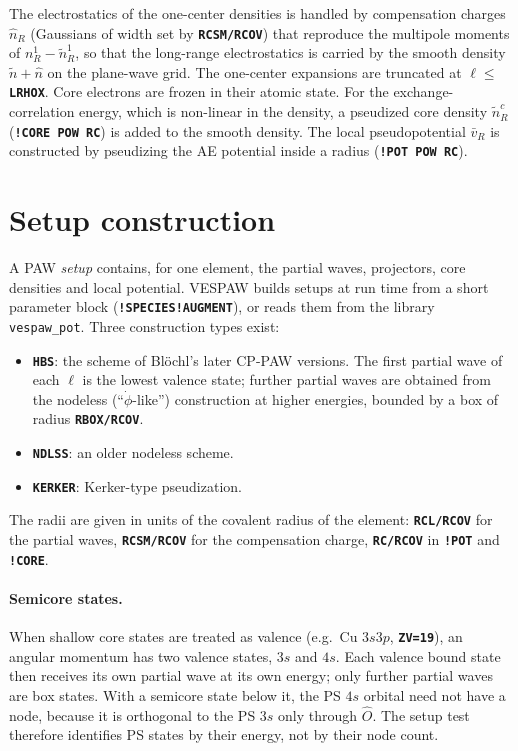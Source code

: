 \documentclass[11pt,a4paper,oneside]{book}
\newcommand{\key}[1]{\textbf{\texttt{#1}}}
\begin{document}
The electrostatics of the one-center densities is handled by
compensation charges $\hat n_R$ (Gaussians of width set by
\key{RCSM/RCOV}) that reproduce the multipole moments of
$n^1_R-\tilde n^1_R$, so that the long-range electrostatics is carried by
the smooth density $\tilde n+\hat n$ on the plane-wave grid. The
one-center expansions are truncated at $\ell\le$ \key{LRHOX}. Core
electrons are frozen in their atomic state. For the exchange-correlation
energy, which is non-linear in the density, a pseudized core density
$\tilde n^c_R$ (\key{!CORE POW RC}) is added to the smooth density. The
local pseudopotential $\bar v_R$ is constructed by pseudizing the AE
potential inside a radius (\key{!POT POW RC}).

\section{Setup construction}\label{sec:setups}

A PAW \emph{setup} contains, for one element, the partial waves,
projectors, core densities and local potential. VESPAW builds setups at
run time from a short parameter block (\key{!SPECIES!AUGMENT}), or reads
them from the library \texttt{vespaw\_pot}. Three construction types exist:
\begin{itemize}
\item \key{HBS}: the scheme of Bl\"ochl's later CP-PAW versions. The
  first partial wave of each $\ell$ is the lowest valence state; further
  partial waves are obtained from the nodeless (``$\dot\phi$-like'')
  construction at higher energies, bounded by a box of radius
  \key{RBOX/RCOV}.
\item \key{NDLSS}: an older nodeless scheme.
\item \key{KERKER}: Kerker-type pseudization.
\end{itemize}
The radii are given in units of the covalent radius of the element:
\key{RCL/RCOV} for the partial waves, \key{RCSM/RCOV} for the compensation
charge, \key{RC/RCOV} in \key{!POT} and \key{!CORE}.

\paragraph{Semicore states.} When shallow core states are treated as
valence (e.g.\ Cu $3s3p$, \key{ZV=19}), an angular momentum has two
valence states, $3s$ and $4s$. Each valence bound state then receives its
own partial wave at its own energy; only further partial waves are box
states. With a semicore state below it, the PS $4s$ orbital need not have
a node, because it is orthogonal to the PS $3s$ only through $\hat O$. The
setup test therefore identifies PS states by their energy, not by their
node count.
\end{document}
